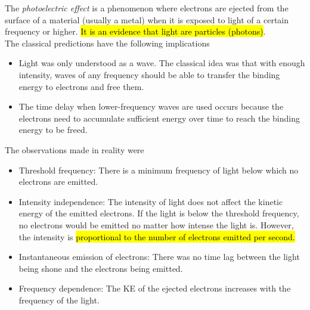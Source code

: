 \documentclass[a4paper,12pt]{article}
\newcommand{\lb}{\\[8pt]}
\begin{document}
The \textit{photoelectric effect} is a phenomenon where electrons are ejected from the surface of a material (usually a metal) when it is exposed to light of a certain frequency or higher. \hl{It is an evidence that light are particles (photons)}.\lb
The classical predictions have the following implications
\begin{itemize}
  \item Light was only understood as a wave. The classical idea was that with enough intensity, waves of any frequency should be able to transfer the binding energy to electrons and free them.
  \item The time delay when lower-frequency waves are used occurs because the electrons need to accumulate sufficient energy over time to reach the binding energy to be freed.
\end{itemize}
The observations made in reality were
\begin{itemize}
  \item Threshold frequency: There is a minimum frequency of light below which no electrons are emitted.
  \item Intensity independence: The intensity of light does not affect the kinetic energy of the emitted electrons. If the light is below the threshold frequency, no electrons would be emitted no matter how intense the light is. However, the intensity is \hl{proportional to the number of electrons emitted per second.}
  \item Instantaneous emission of electrons: There was no time lag between the light being shone and the electrons being emitted.
  \item Frequency dependence: The KE of the ejected electrons increases with the frequency of the light.
\end{itemize}
\end{document}

